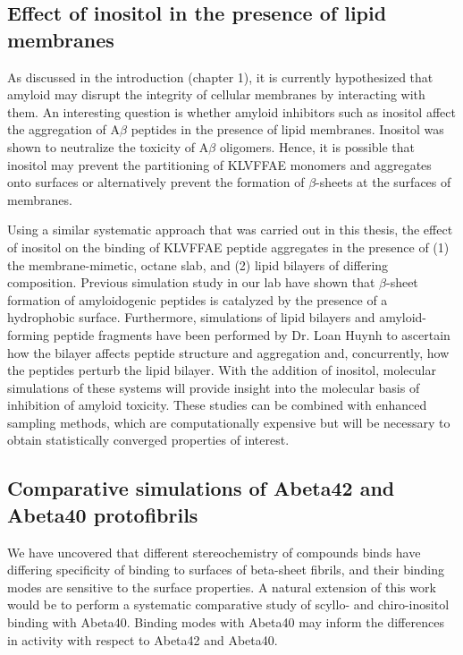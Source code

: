 \subsection{Effect of inositol in the presence of lipid membranes}
As discussed in the introduction (chapter 1), it is currently hypothesized that amyloid may disrupt the integrity of cellular membranes by interacting with them. An interesting question is whether amyloid inhibitors such as inositol affect the aggregation of A$\beta$ peptides in the presence of lipid membranes. Inositol was shown to neutralize the toxicity of A$\beta$ oligomers.\cite{McLaurin:2000bq}  Hence, it is possible that inositol may prevent the partitioning of KLVFFAE monomers and aggregates onto surfaces or alternatively prevent the formation of $\beta$-sheets at the surfaces of membranes.\cite{references}

Using a similar systematic approach that was carried out in this thesis, the effect of inositol on the binding of KLVFFAE peptide aggregates in the presence of (1) the membrane-mimetic, octane slab, and (2) lipid bilayers of differing composition. Previous simulation study in our lab have shown that $\beta$-sheet formation of amyloidogenic peptides is catalyzed by the presence of a hydrophobic surface.\cite{Nikolic:2010go} Furthermore, simulations of lipid bilayers and amyloid-forming peptide fragments have been performed by Dr. Loan Huynh to ascertain how the bilayer affects peptide structure and aggregation and, concurrently, how the peptides perturb the lipid bilayer. With the addition of inositol, molecular simulations of these systems will provide insight into the  molecular basis of inhibition of amyloid toxicity. These studies can be combined with enhanced sampling methods,\cite{TVREX, STDR} which are computationally expensive but will be necessary to obtain statistically converged properties of interest.

\subsection{Comparative simulations of Abeta42 and Abeta40 protofibrils}
We have uncovered that different stereochemistry of compounds binds have differing specificity of binding to surfaces of beta-sheet fibrils, and their binding modes are sensitive to the surface properties.  
A natural extension of this work would be to perform a systematic comparative study of scyllo- and chiro-inositol binding with Abeta40.  Binding modes with Abeta40 may inform the differences in activity with respect to Abeta42 and Abeta40.


